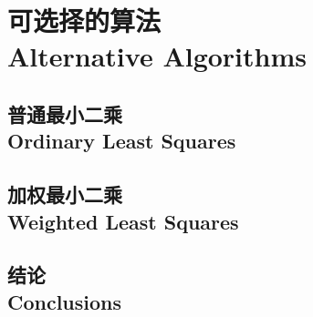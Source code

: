 \section[可选择的算法]{可选择的算法\\Alternative Algorithms}

	\subsection[普通最小二乘]{普通最小二乘\\Ordinary Least Squares}
	
	\subsection[加权最小二乘]{加权最小二乘\\Weighted Least Squares}
	
	\subsection[结论]{结论\\Conclusions}
	
